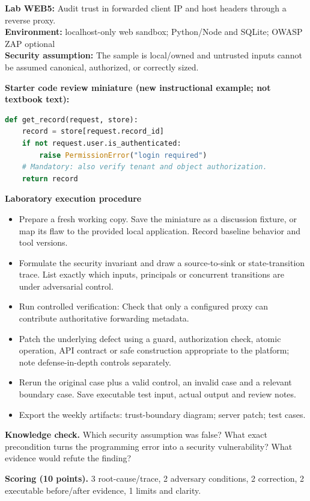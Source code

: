 \documentclass[10pt,letterpaper]{article}
\begin{document}
\begin{insight}\textbf{Lab WEB5:} Audit trust in forwarded client IP and host headers through a reverse proxy.\\\textbf{Environment:} localhost-only web sandbox; Python/Node and SQLite; OWASP ZAP optional\\\textbf{Security assumption:} The sample is local/owned and untrusted inputs cannot be assumed canonical, authorized, or correctly sized.\end{insight}
\textbf{Starter code review miniature (new instructional example; not textbook text):}
\begin{lstlisting}[language=Python]
def get_record(request, store):
    record = store[request.record_id]
    if not request.user.is_authenticated:
        raise PermissionError("login required")
    # Mandatory: also verify tenant and object authorization.
    return record
\end{lstlisting}
\textbf{Laboratory execution procedure}
\begin{itemize}[leftmargin=*,itemsep=2pt]
\item Prepare a fresh working copy. Save the miniature as a discussion fixture, or map its flaw to the provided local application. Record baseline behavior and tool versions.
\item Formulate the security invariant and draw a source-to-sink or state-transition trace. List exactly which inputs, principals or concurrent transitions are under adversarial control.
\item Run controlled verification: Check that only a configured proxy can contribute authoritative forwarding metadata.
\item Patch the underlying defect using a guard, authorization check, atomic operation, API contract or safe construction appropriate to the platform; note defense-in-depth controls separately.
\item Rerun the original case plus a valid control, an invalid case and a relevant boundary case. Save executable test input, actual output and review notes.
\item Export the weekly artifacts: trust-boundary diagram; server patch; test cases.
\end{itemize}
\textbf{Knowledge check.} Which security assumption was false? What exact precondition turns the programming error into a security vulnerability? What evidence would refute the finding?

\textbf{Scoring (10 points).} 3 root-cause/trace, 2 adversary conditions, 2 correction, 2 executable before/after evidence, 1 limits and clarity.
\end{document}
